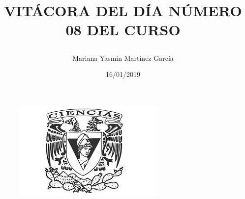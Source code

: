 \documentclass{article}
\title{\Huge\item\color{blue}\textbf{VITÁCORA DEL DÍA NÚMERO 08 DEL CURSO}}
\author{\Large Mariana Yasmin Martínez García}
\date{\Large 16/01/2019}
\begin{document}
\begin{figure}[t]
	\centering
	\includegraphics[width=0.7\linewidth]{Imagenes/1}
	\caption{}
	\label{fig:1}
\end{figure}

	\maketitle
		
	\newpage
	
\end{document}
